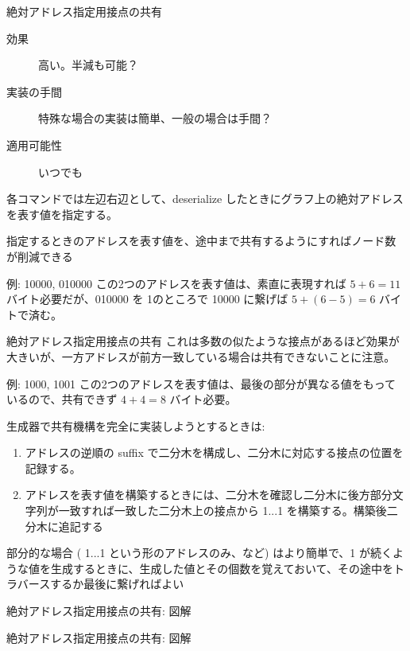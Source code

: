 \documentclass[12pt,unicode]{beamer}
\begin{document}
\begin{frame}{絶対アドレス指定用接点の共有}
   \begin{description}
      \item[効果] 高い。半減も可能？
      \item[実装の手間] 特殊な場合の実装は簡単、一般の場合は手間？
      \item[適用可能性] いつでも
   \end{description}

   各コマンドでは左辺右辺として、deserialize したときにグラフ上の絶対アドレスを表す値を指定する。

   指定するときのアドレスを表す値を、途中まで共有するようにすればノード数が削減できる

   例: 10000, 010000 この2つのアドレスを表す値は、素直に表現すれば $5 + 6 = 11$ バイト必要だが、010000 を 1のところで 10000 に繋げば $5 + (6-5) = 6$ バイトで済む。

\end{frame}

\begin{frame}{絶対アドレス指定用接点の共有}
   これは多数の似たような接点があるほど効果が大きいが、一方アドレスが前方一致している場合は共有できないことに注意。

   例: 1000, 1001 この2つのアドレスを表す値は、最後の部分が異なる値をもっているので、共有できず $4 + 4 = 8$ バイト必要。

   生成器で共有機構を完全に実装しようとするときは:
   \begin{enumerate}
      \item アドレスの逆順の suffix で二分木を構成し、二分木に対応する接点の位置を記録する。
      \item アドレスを表す値を構築するときには、二分木を確認し二分木に後方部分文字列が一致すれば一致した二分木上の接点から 1...1 を構築する。構築後二分木に追記する
   \end{enumerate}

   部分的な場合 ( 1...1 という形のアドレスのみ、など) はより簡単で、1 が続くような値を生成するときに、生成した値とその個数を覚えておいて、その途中をトラバースするか最後に繋げればよい
\end{frame}

\begin{frame}{絶対アドレス指定用接点の共有: 図解}
   \quad
\end{frame}
\begin{frame}{絶対アドレス指定用接点の共有: 図解}
   \quad
\end{frame}
\end{document}
